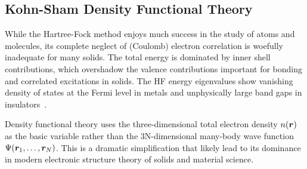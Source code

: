 \subsection{Kohn-Sham Density Functional Theory}
While the Hartree-Fock method enjoys much success in the study of atoms and molecules, its complete neglect of (Coulomb) electron correlation is woefully inadequate for many solids. The total energy is dominated by inner shell contributions, which overshadow the valence contributions important for bonding and correlated excitations in solids. The HF energy eigenvalues show vanishing density of states at the Fermi level in metals and unphysically large band gaps in insulators~\cite{Perdew1981}.

Density functional theory uses the three-dimensional total electron density $n(\boldsymbol{r})$ as the basic variable rather than the 3N-dimensional many-body wave function $\Psi(\boldsymbol{r}_1,\dots,\boldsymbol{r}_N)$. This is a dramatic simplification that likely lead to its dominance in modern electronic structure theory of solids and material science.

